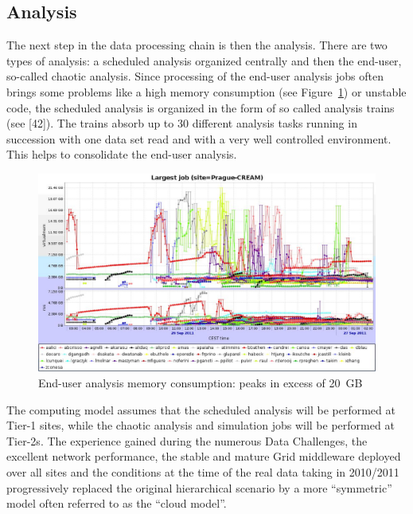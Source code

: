 \documentclass{intech}
\begin{document}
\subsection{Analysis}
%
The next step in the data processing chain is then the analysis.
There are two types of analysis: a scheduled analysis organized
centrally and then the end-user, so-called chaotic analysis. Since
processing of the end-user analysis jobs often brings some problems
like a high memory consumption (see Figure~\ref{fig12}) or unstable
code, the scheduled analysis is organized in the form of so called
analysis trains (see [42]). The trains absorb up to 30 different
analysis tasks running in succession with one data set read and with
a very well controlled environment. This helps to consolidate the
end-user analysis.

\begin{figure}[htb] %
\centering
\includegraphics[width=13cm]{fig12.eps} %
\caption{End-user analysis memory consumption: peaks in excess of
20~GB}\label{fig12}
\end{figure}


The computing model assumes that the scheduled analysis will be
performed at Tier-1 sites, while the chaotic analysis and simulation
jobs will be performed at Tier-2s. The experience gained during the
numerous Data Challenges, the excellent network performance, the
stable and mature Grid middleware deployed over all sites and the
conditions at the time of the real data taking in 2010/2011
progressively replaced the original hierarchical scenario by a more
``symmetric'' model often referred to as the ``cloud model''.
\end{document}
